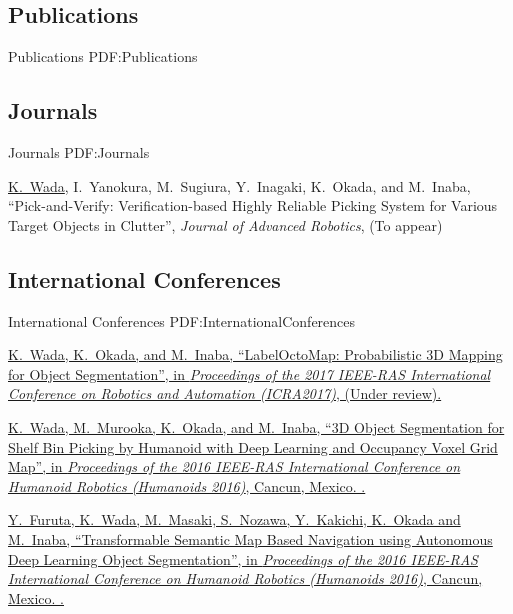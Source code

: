 \documentclass[letterpaper,MMMyyyy,nonstop]{simpleresumecv}
\begin{document}
\begin{body}

\section
{Publications}
{Publications}
{PDF:Publications}

\subsection
{Journals}
{Journals}
{PDF:Journals}

\GapNoBreak
\NumberedItem{{\CharSpace}[7]}
\underline{K.~Wada}, I.~Yanokura, M.~Sugiura, Y.~Inagaki, K.~Okada, and M.~Inaba,
``Pick-and-Verify: Verification-based Highly Reliable Picking System for Various Target Objects in Clutter'',
\textit{Journal of Advanced Robotics},
(To appear)

\BigGap
\subsection
{International Conferences}
{International Conferences}
{PDF:InternationalConferences}

\GapNoBreak
\NumberedItem{{\CharSpace}[8]}
\href{http://www.icra2017.org/}
{\underline{K.~Wada}, K.~Okada, and M.~Inaba,
``LabelOctoMap: Probabilistic 3D Mapping for Object Segmentation'',
in \textit{Proceedings of the 2017 IEEE-RAS International Conference on Robotics and Automation (ICRA2017)},
(Under review).}

\GapNoBreak
\NumberedItem{{\CharSpace}[6]}
\href{https://ras.papercept.net/conferences/conferences/ICHR16/program/ICHR16_ContentListWeb_2.html}
{\underline{K.~Wada}, M.~Murooka, K.~Okada, and M.~Inaba,
``3D Object Segmentation for Shelf Bin Picking by Humanoid with Deep Learning and Occupancy Voxel Grid Map'',
in \textit{Proceedings of the 2016 IEEE-RAS International Conference on Humanoid Robotics (Humanoids 2016)},
Cancun, Mexico.
.}

\GapNoBreak
\NumberedItem{{\CharSpace}[5]}
\href{https://ras.papercept.net/conferences/conferences/ICHR16/program/ICHR16_ContentListWeb_1.html}
{Y.~Furuta, \underline{K.~Wada}, M.~Masaki, S.~Nozawa, Y.~Kakichi, K.~Okada and M.~Inaba,
``Transformable Semantic Map Based Navigation using Autonomous Deep Learning Object Segmentation'',
in \textit{Proceedings of the 2016 IEEE-RAS International Conference on Humanoid Robotics (Humanoids 2016)},
Cancun, Mexico.
.}


\end{body}
\end{document}

